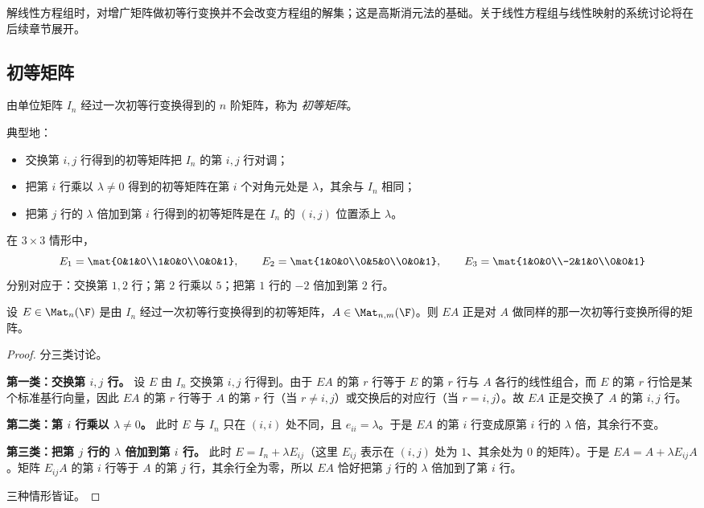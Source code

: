 \begin{remark}
解线性方程组时，对增广矩阵做初等行变换并不会改变方程组的解集；这是高斯消元法的基础。关于线性方程组与线性映射的系统讨论将在后续章节展开。
\end{remark}

\subsection{初等矩阵}

\begin{definition}
由单位矩阵 $I_n$ 经过一次初等行变换得到的 $n$ 阶矩阵，称为 \emph{初等矩阵}。
\end{definition}

典型地：
\begin{itemize}
  \item 交换第 $i,j$ 行得到的初等矩阵把 $I_n$ 的第 $i,j$ 行对调；
  \item 把第 $i$ 行乘以 $\lambda\ne 0$ 得到的初等矩阵在第 $i$ 个对角元处是 $\lambda$，其余与 $I_n$ 相同；
  \item 把第 $j$ 行的 $\lambda$ 倍加到第 $i$ 行得到的初等矩阵是在 $I_n$ 的 $(i,j)$ 位置添上 $\lambda$。
\end{itemize}

\begin{example}
在 $3\times 3$ 情形中，
\[
E_1=\mat{0&1&0\\1&0&0\\0&0&1},\qquad
E_2=\mat{1&0&0\\0&5&0\\0&0&1},\qquad
E_3=\mat{1&0&0\\-2&1&0\\0&0&1}
\]
分别对应于：交换第 $1,2$ 行；第 $2$ 行乘以 $5$；把第 $1$ 行的 $-2$ 倍加到第 $2$ 行。
\end{example}

\begin{proposition}[左乘初等矩阵对应行变换]
设 $E\in\Mat_n(\F)$ 是由 $I_n$ 经过一次初等行变换得到的初等矩阵，$A\in\Mat_{n,m}(\F)$。则 $EA$ 正是对 $A$ 做同样的那一次初等行变换所得的矩阵。
\end{proposition}

\begin{proof}
分三类讨论。

\textbf{第一类：交换第 $i,j$ 行。} 设 $E$ 由 $I_n$ 交换第 $i,j$ 行得到。由于 $EA$ 的第 $r$ 行等于 $E$ 的第 $r$ 行与 $A$ 各行的线性组合，而 $E$ 的第 $r$ 行恰是某个标准基行向量，因此 $EA$ 的第 $r$ 行等于 $A$ 的第 $r$ 行（当 $r\ne i,j$）或交换后的对应行（当 $r=i,j$）。故 $EA$ 正是交换了 $A$ 的第 $i,j$ 行。

\textbf{第二类：第 $i$ 行乘以 $\lambda\ne 0$。} 此时 $E$ 与 $I_n$ 只在 $(i,i)$ 处不同，且 $e_{ii}=\lambda$。于是 $EA$ 的第 $i$ 行变成原第 $i$ 行的 $\lambda$ 倍，其余行不变。

\textbf{第三类：把第 $j$ 行的 $\lambda$ 倍加到第 $i$ 行。} 此时 $E=I_n+\lambda E_{ij}$（这里 $E_{ij}$ 表示在 $(i,j)$ 处为 $1$、其余处为 $0$ 的矩阵）。于是 $EA=A+\lambda E_{ij}A$。矩阵 $E_{ij}A$ 的第 $i$ 行等于 $A$ 的第 $j$ 行，其余行全为零，所以 $EA$ 恰好把第 $j$ 行的 $\lambda$ 倍加到了第 $i$ 行。

三种情形皆证。
\end{proof}


